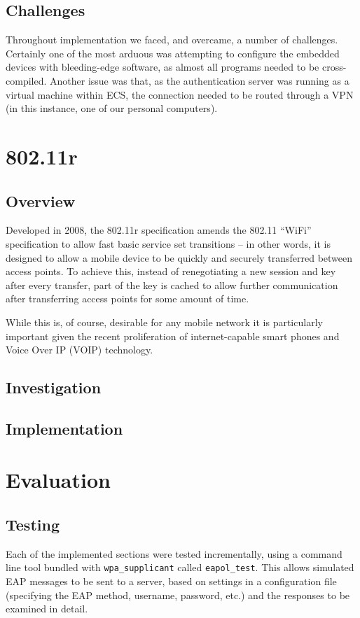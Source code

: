 \documentclass[12pt,a4paper,titlepage]{article}
\begin{document}
\subsection{Challenges}
Throughout implementation we faced, and overcame, a number of challenges. Certainly one of the most arduous was attempting to configure the embedded devices with bleeding-edge software, as almost all programs needed to be cross-compiled. Another issue was that, as the authentication server was running as a virtual machine within ECS, the connection needed to be routed through a VPN (in this instance, one of our personal computers).

\newpage
\section{802.11r}

\subsection{Overview}
Developed in 2008, the 802.11r specification amends the 802.11 ``WiFi'' specification to allow fast basic service set transitions -- in other words, it is designed to allow a mobile device to be quickly and securely transferred between access points. To achieve this, instead of renegotiating a new session and key after every transfer, part of the key is cached to allow further communication after transferring access points for some amount of time.

While this is, of course, desirable for any mobile network it is particularly important given the recent proliferation of internet-capable smart phones and Voice Over IP (VOIP) technology.

\subsection{Investigation}

\subsection{Implementation}

\newpage
\section{Evaluation}

\subsection{Testing}
Each of the implemented sections were tested incrementally, using a command line tool bundled with \texttt{wpa\_supplicant} called \texttt{eapol\_test}. This allows simulated EAP messages to be sent to a server, based on settings in a configuration file (specifying the EAP method, username, password, etc.) and the responses to be examined in detail. 
\end{document}
